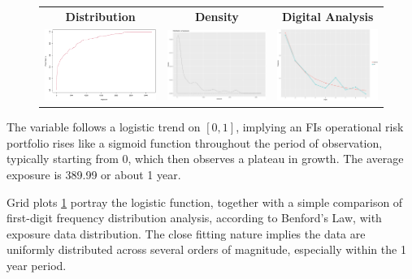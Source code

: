 \documentclass[]{DissertateUSU}
\begin{document}
\begin{figure}
\begin{frame}
      \centering
       \begin{tabular}{ccc}
        \textbf{Distribution} & \textbf{Density} & \textbf{Digital Analysis} \\
        \includegraphics[width=5cm]{Exposure_cdf.eps}
         &
         \includegraphics[width=5cm]{Dist_exposure.eps}
         &
         \includegraphics[width=5cm]{Benford.eps}
         \end{tabular}
    \end{frame}
    \label{Exploration_analysis_exposure}
\end{figure}

The variable follows a logistic trend on \([0,1]\), implying an FIs
operational risk portfolio rises like a sigmoid function throughout the
period of observation, typically starting from \(0\), which then
observes a plateau in growth. The average exposure is 389.99 or about 1
year.\medskip

Grid plots \ref{Exploration_analysis_exposure} portray the logistic
function, together with a simple comparison of first-digit frequency
distribution analysis, according to Benford's Law, with exposure data
distribution. The close fitting nature implies the data are uniformly
distributed across several orders of magnitude, especially within the 1
year period.\medskip
\end{document}
